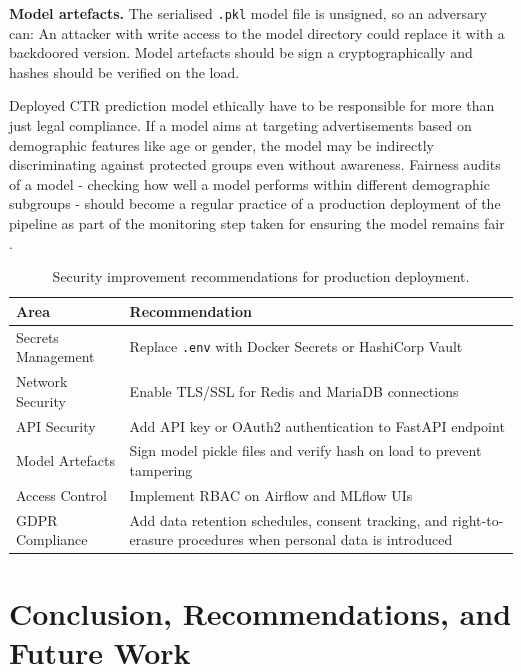 \documentclass[12pt,a4paper]{article}
\begin{document}
\textbf{Model artefacts.} The serialised \texttt{.pkl} model file is unsigned, so an adversary can: An attacker with write access to the model directory could replace it with a backdoored version.
Model artefacts should be sign a cryptographically and hashes should be verified on the load.

Deployed CTR prediction model ethically have to be responsible for more than just legal compliance. If a model aims at targeting advertisements based on demographic features like age or gender,
the model may be indirectly discriminating against protected groups even without awareness. Fairness audits of a model - checking how well a model performs within different demographic subgroups -
should become a regular practice of a production deployment of the pipeline as part of the monitoring step taken for ensuring the model remains fair \cite{sculley2015}. 




\begin{table}[H]
\centering
\caption{Security improvement recommendations for production deployment.}
\label{tab:security}
\small
\renewcommand{\arraystretch}{1.3}
\begin{tabular}{|L{3.5cm}|L{9cm}|}
\hline
\textbf{Area} & \textbf{Recommendation} \\
\hline
Secrets Management   & Replace \texttt{.env} with Docker Secrets or HashiCorp Vault \\
\hline
Network Security     & Enable TLS/SSL for Redis and MariaDB connections \\
\hline
API Security         & Add API key or OAuth2 authentication to FastAPI endpoint \\
\hline
Model Artefacts      & Sign model pickle files and verify hash on load to prevent tampering \\
\hline
Access Control       & Implement RBAC on Airflow and MLflow UIs \\
\hline
GDPR Compliance      & Add data retention schedules, consent tracking, and right-to-erasure procedures when personal data is introduced \\
\hline
\end{tabular}
\end{table}

\section{Conclusion, Recommendations, and Future Work}
\end{document}
